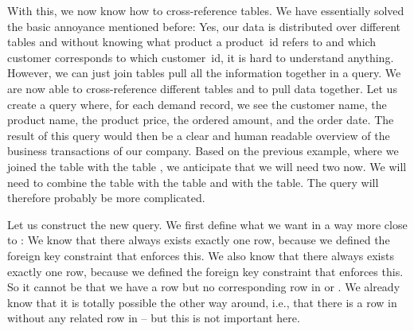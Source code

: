 With this, we now know how to cross-reference tables.
We have essentially solved the basic annoyance mentioned before:
Yes, our data is distributed over different tables and without knowing what product a product~id refers to and which customer corresponds to which customer~id, it is hard to understand anything.
However, we can just join tables pull all the information together in a query.%
%
\FloatBarrier%
\endhsection%
%
%
%
We are now able to cross-reference different tables and to pull data together.
Let us create a query where, for each demand record, we see the customer name, the product name, the product price, the ordered amount, and the order date.
The result of this query would then be a clear and human readable overview of the business transactions of our company.
Based on the previous example, where we joined the table  with the table , we anticipate that we will need two  now.
We will need to combine the  table with the  table and with the  table.
The query will therefore probably be more complicated.

Let us construct the new query.
We first define what we want in a way more close to \sql:
\emph{}
We know that there always exists exactly one  row, because we defined the foreign key  constraint that enforces this.
We also know that there always exists exactly one  row, because we defined the foreign key  constraint that enforces this.
So it cannot be that we have a row  but no corresponding row in  or .
We already know that it is totally possible the other way around, i.e., that there is a row in  without any related row in  -- but this is not important here.

